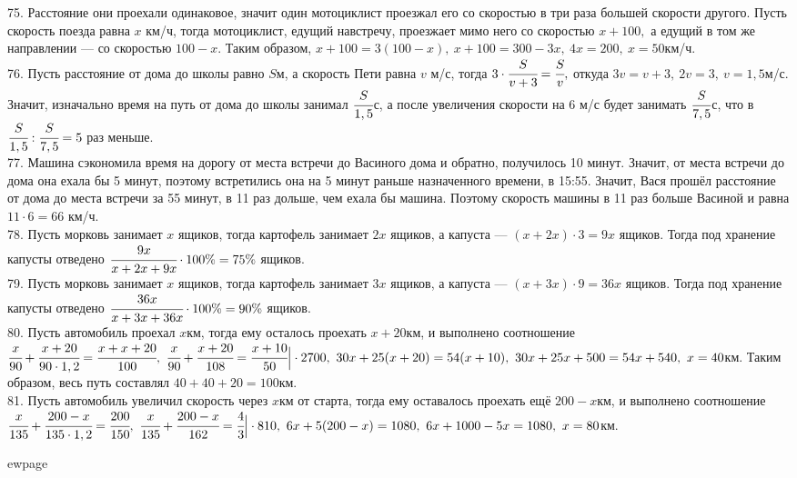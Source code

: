 75. Расстояние они проехали одинаковое, значит один мотоциклист проезжал его со скоростью в три раза большей скорости другого. Пусть скорость поезда равна $x$ км/ч, тогда мотоциклист, едущий навстречу, проезжает мимо него со скоростью $x+100,$ а едущий в том же направлении --- со скоростью $100-x.$ Таким образом, $x+100=3(100-x),\ x+100=300-3x,\ 4x=200,\ x=50$км/ч.\\
76. Пусть расстояние от дома до школы равно $S$м, а скорость Пети равна $v$ м/с, тогда $3\cdot\cfrac{S}{v+3}=\cfrac{S}{v},$ откуда $3v=v+3,\ 2v=3,\ v=1,5$м/с. Значит, изначально время на путь от дома до школы занимал $\cfrac{S}{1,5}$с, а после увеличения скорости на 6 м/с будет занимать $\cfrac{S}{7,5}$с, что в $\cfrac{S}{1,5}:\cfrac{S}{7,5}=5$ раз меньше.\\
77. Машина сэкономила время на дорогу от места встречи до Васиного дома и обратно, получилось 10 минут. Значит, от места встречи до дома она ехала бы 5 минут, поэтому встретились она на 5 минут раньше назначенного времени, в 15:55. Значит, Вася прошёл расстояние от дома до места встречи за 55 минут, в 11 раз дольше, чем ехала бы машина. Поэтому скорость машины в 11 раз больше Васиной и равна $11\cdot6=66$ км/ч.\\
78. Пусть морковь занимает $x$ ящиков, тогда картофель занимает $2x$ ящиков, а капуста --- $(x+2x)\cdot3=9x$ ящиков. Тогда под хранение капусты отведено $\cfrac{9x}{x+2x+9x}\cdot100\%=75\%$ ящиков.\\
79. Пусть морковь занимает $x$ ящиков, тогда картофель занимает $3x$ ящиков, а капуста --- $(x+3x)\cdot9=36x$ ящиков. Тогда под хранение капусты отведено $\cfrac{36x}{x+3x+36x}\cdot100\%=90\%$ ящиков.\\
80. Пусть автомобиль проехал $x$км, тогда ему осталось проехать $x+20$км, и выполнено соотношение $\cfrac{x}{90}+\cfrac{x+20}{90\cdot1,2}=\cfrac{x+x+20}{100},\
\cfrac{x}{90}+\cfrac{x+20}{108}=\cfrac{x+10}{50}\Big|\cdot2700,\
30x+25(x+20)=54(x+10),\ 30x+25x+500=54x+540,\ x=40$км. Таким образом, весь путь составлял $40+40+20=100$км.\\
81. Пусть автомобиль увеличил скорость через $x$км от старта, тогда ему оставалось проехать ещё $200-x$км, и выполнено соотношение
$\cfrac{x}{135}+\cfrac{200-x}{135\cdot1,2}=\cfrac{200}{150},\
\cfrac{x}{135}+\cfrac{200-x}{162}=\cfrac{4}{3}\Big|\cdot 810,\
6x+5(200-x)=1080,\ 6x+1000-5x=1080,\ x=80$км.

ewpage
